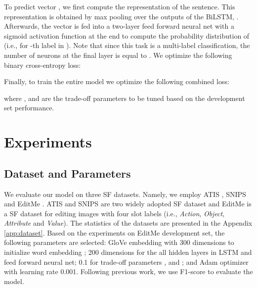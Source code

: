 \documentclass[11pt,a4paper]{article}
\begin{document}
To predict vector , we first compute the representation of the sentence. This representation is obtained by max pooling over the outputs of the BiLSTM, . Afterwards, the vector  is fed into a two-layer feed forward neural net with a sigmoid activation function at the end to compute the probability distribution of (i.e.,  for -th label in ). Note that since this task is a multi-label classification, the number of neurons at the final layer is equal to . We optimize the following binary cross-entropy loss:


Finally, to train the entire model we optimize the following combined loss:


where ,  and  are the trade-off parameters to be tuned based on the development set performance.

















\section{Experiments}

\subsection{Dataset and Parameters}
We evaluate our model on three SF datasets. Namely, we employ ATIS \cite{hemphill:90}, SNIPS \cite{coucke:18} and EditMe \cite{manuvinakurike2018edit}. ATIS and SNIPS are two widely adopted SF dataset and EditMe is a SF dataset for editing images with four slot labels (i.e., \textit{Action}, \textit{Object}, \textit{Attribute} and \textit{Value}). The statistics of the datasets are presented in the Appendix \ref{app:dataset}. Based on the experiments on EditMe development set, the following parameters are selected: GloVe embedding with 300 dimensions to initialize word embedding
; 200 dimensions for the all hidden layers in LSTM and feed forward neural net; 0.1 for trade-off parameters ,  and ; 
and Adam optimizer with learning rate 0.001. Following previous work, we use F1-score to evaluate the model.
\end{document}
